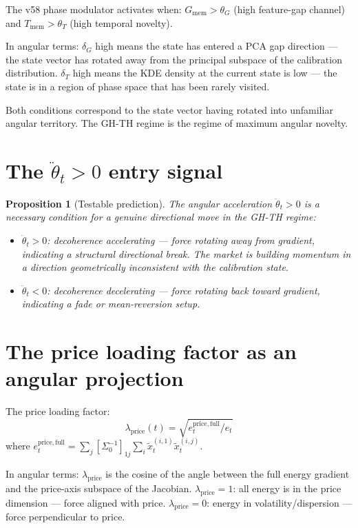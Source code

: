 \documentclass[11pt,a4paper,openany]{book}
\newtheorem{proposition}[theorem]{Proposition}
\theoremstyle{definition}
\begin{document}
The v58 phase modulator activates when:
$G_\mathrm{mem} > \theta_G$ (high feature-gap channel) and $T_\mathrm{mem} > \theta_T$ (high temporal novelty).

In angular terms: $\delta_G$ high means the state has entered a PCA gap direction
— the state vector has rotated away from the principal subspace of the calibration distribution.
$\delta_T$ high means the KDE density at the current state is low — the state is in
a region of phase space that has been rarely visited.

Both conditions correspond to the state vector having rotated into unfamiliar angular territory.
The GH-TH regime is the regime of maximum angular novelty.

\section{The $\ddot\theta_t > 0$ entry signal}

\begin{proposition}[Testable prediction]
The angular acceleration $\ddot\theta_t > 0$ is a necessary condition for
a genuine directional move in the GH-TH regime:
\begin{itemize}
\item $\ddot\theta_t > 0$: decoherence accelerating — force rotating away from gradient,
  indicating a structural directional break. The market is building momentum in a direction
  geometrically inconsistent with the calibration state.
\item $\ddot\theta_t < 0$: decoherence decelerating — force rotating back toward gradient,
  indicating a fade or mean-reversion setup.
\end{itemize}
\end{proposition}

\section{The price loading factor as an angular projection}

The price loading factor:
\[
\lambda_\mathrm{price}(t) = \sqrt{e_t^\mathrm{price,full}/e_t}
\]
where $e_t^\mathrm{price,full} = \sum_j [\Sigma_0^{-1}]_{1j}\sum_i\tilde x_t^{(i,1)}\tilde x_t^{(i,j)}$.

In angular terms: $\lambda_\mathrm{price}$ is the cosine of the angle between
the full energy gradient and the price-axis subspace of the Jacobian.
$\lambda_\mathrm{price} = 1$: all energy is in the price dimension — force aligned with price.
$\lambda_\mathrm{price} = 0$: energy in volatility/dispersion — force perpendicular to price.
\end{document}
